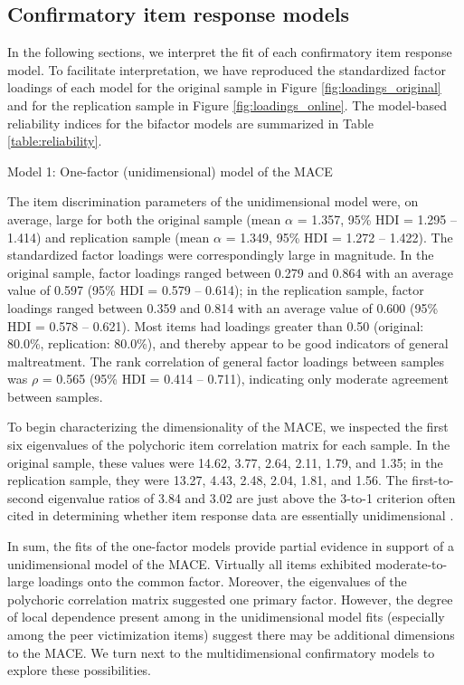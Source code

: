\documentclass[letterpaper,man,natbib,floatsintext,longtable]{apa6}
\makeatletter
\renewcommand{\subsubsection}{\@startsection{subsubsection}{3}
  {\z@}%
  {\b@level@two@skip}{\e@level@two@skip}%
  {\normalfont\normalsize\bfseries}}
\makeatother
\begin{document}
\subsection{Confirmatory item response models}

In the following sections, we interpret the fit of each confirmatory item response model. To facilitate interpretation, we have reproduced the standardized factor loadings of each model for the original sample in Figure \ref{fig:loadings_original} and for the replication sample in Figure \ref{fig:loadings_online}. The model-based reliability indices for the bifactor models are summarized in Table \ref{table:reliability}. 

\subsubsection{Model 1: One-factor (unidimensional) model of the MACE}

The item discrimination parameters of the unidimensional model were, on average, large for both the original sample (mean $\alpha$ = 1.357, 95\% HDI = 1.295 -- 1.414) and replication sample (mean $\alpha$ = 1.349, 95\% HDI = 1.272 -- 1.422). The standardized factor loadings were correspondingly large in magnitude. In the original sample, factor loadings ranged between 0.279 and 0.864 with an average value of 0.597 (95\% HDI = 0.579 -- 0.614); in the replication sample, factor loadings ranged between 0.359 and 0.814 with an average value of 0.600 (95\% HDI = 0.578 -- 0.621). Most items had loadings greater than 0.50 (original: 80.0\%, replication: 80.0\%), and thereby appear to be good indicators of general maltreatment. The rank correlation of general factor loadings between samples was $\rho$ = 0.565 (95\% HDI = 0.414 -- 0.711), indicating only moderate agreement between samples.

To begin characterizing the dimensionality of the MACE, we inspected the first six eigenvalues of the polychoric item correlation matrix for each sample. In the original sample, these values were 14.62, 3.77, 2.64, 2.11, 1.79, and 1.35; in the replication sample, they were 13.27, 4.43, 2.48, 2.04, 1.81, and 1.56. The first-to-second eigenvalue ratios of 3.84 and 3.02 are just above the 3-to-1 criterion often cited in determining whether item response data are essentially unidimensional \citep{embretson2013item}. 

In sum, the fits of the one-factor models provide partial evidence in support of a unidimensional model of the MACE. Virtually all items exhibited moderate-to-large loadings onto the common factor. Moreover, the eigenvalues of the polychoric correlation matrix suggested one primary factor. However, the degree of local dependence present among in the unidimensional model fits (especially among the peer victimization items) suggest there may be additional dimensions to the MACE. We turn next to the multidimensional confirmatory models to explore these possibilities.
\end{document}

